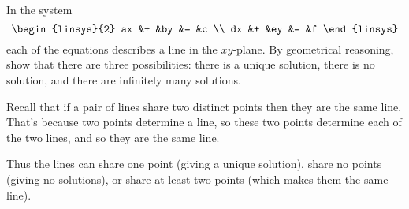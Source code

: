 

\begin{Exercise}[
name={},
title={}, 
difficulty=0,
origin={\cite{JH}}]
In the system
\begin{equation*}
\begin{linsys}{2}
ax  &+  &by  &=  &c  \\
dx  &+  &ey  &=  &f  
\end{linsys}
\end{equation*}
each of the equations describes a line in the \( xy \)-plane.
By geometrical reasoning, show that there are three possibilities:
there is a unique solution, there is no solution, 
and there are infinitely many solutions.
\end{Exercise}

\begin{Answer}
     Recall that if a pair of lines share two distinct points then
      they are the same line. 
      That's because two points determine a line, so these
      two points determine each of the two lines, 
      and so they are the same line.

      Thus the lines can share one point (giving a unique solution), 
      share no points (giving no solutions), or
      share at least two points (which makes them the same line). 
\end{Answer}
